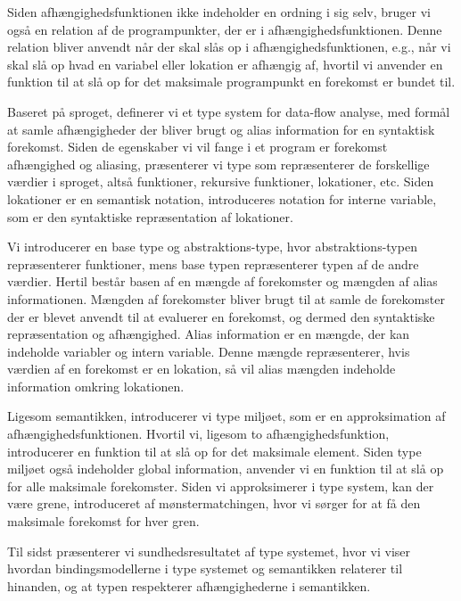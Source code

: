 \documentclass[../master.tex]{subfiles}
\begin{document}
Siden afhængighedsfunktionen ikke indeholder en ordning i sig selv, bruger vi også en relation af de programpunkter, der er i afhængighedsfunktionen.
Denne relation bliver anvendt når der skal slås op i afhængighedsfunktionen, e.g., når vi skal slå op hvad en variabel eller lokation er afhængig af, hvortil vi anvender en funktion til at slå op for det maksimale programpunkt en forekomst er bundet til.
\bigskip

Baseret på sproget, definerer vi et type system for data-flow analyse, med formål at samle afhængigheder der bliver brugt og alias information for en syntaktisk forekomst.
Siden de egenskaber vi vil fange i et program er forekomst afhængighed og aliasing, præsenterer vi type som repræsenterer de forskellige værdier i sproget, altså funktioner, rekursive funktioner, lokationer, etc.
Siden lokationer er en semantisk notation, introduceres notation for interne variable, som er den syntaktiske repræsentation af lokationer.

Vi introducerer en base type og abstraktions-type, hvor abstraktions-typen repræsenterer funktioner, mens base typen repræsenterer typen af de andre værdier.
Hertil består basen af en mængde af forekomster og mængden af alias informationen.
Mængden af forekomster bliver brugt til at samle de forekomster der er blevet anvendt til at evaluerer en forekomst, og dermed den syntaktiske repræsentation og afhængighed.
Alias information er en mængde, der kan indeholde variabler og intern variable.
Denne mængde repræsenterer, hvis værdien af en forekomst er en lokation, så vil alias mængden indeholde information omkring lokationen.

Ligesom semantikken, introducerer vi type miljøet, som er en approksimation af afhængighedsfunktionen.
Hvortil vi, ligesom to afhængighedsfunktion, introducerer en funktion til at slå op for det maksimale element.
Siden type miljøet også indeholder global information, anvender vi en funktion til at slå op for alle maksimale forekomster.
Siden vi approksimerer i type system, kan der være grene, introduceret af mønstermatchingen, hvor vi sørger for at få den maksimale forekomst for hver gren.

Til sidst præsenterer vi sundhedsresultatet af type systemet, hvor vi viser hvordan bindingsmodellerne i type systemet og semantikken relaterer til hinanden, og at typen respekterer afhængighederne i semantikken.

\newpage
\end{document}
